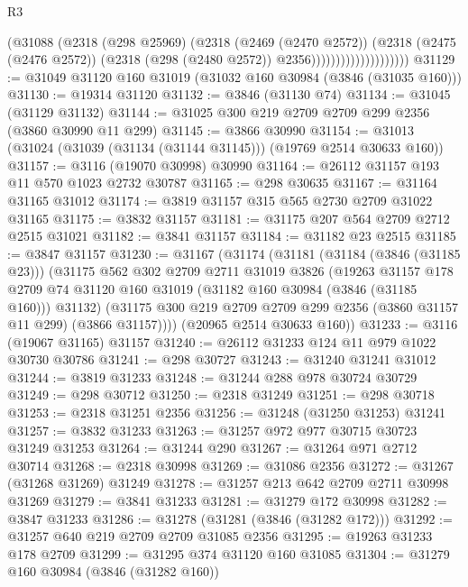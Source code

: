 \begin{lexlean}{R3}
\begin{coremodule}
                                  (@31088
                                    (@2318
                                      (@298 @25969)
                                      (@2318
                                        (@2469 (@2470 @2572))
                                        (@2318
                                          (@2475 (@2476 @2572))
                                          (@2318 (@298 (@2480 @2572)) @2356))))))))))))))))))))
@31129 := @31049 @31120 @160 @31019 (@31032 @160 @30984 (@3846 (@31035 @160)))
@31130 := @19314 @31120
@31132 := @3846 (@31130 @74)
@31134 := @31045 (@31129 @31132)
@31144 := @31025 @300 @219 @2709 @2709 @299 @2356 (@3860 @30990 @11 @299)
@31145 := @3866 @30990
@31154 := @31013 (@31024 (@31039 (@31134 (@31144 @31145))) (@19769 @2514 @30633 @160))
@31157 := @3116 (@19070 @30998) @30990
@31164 := @26112 @31157 @193 @11 @570 @1023 @2732 @30787
@31165 := @298 @30635
@31167 := @31164 @31165 @31012
@31174 := @3819 @31157 @315 @565 @2730 @2709 @31022 @31165
@31175 := @3832 @31157
@31181 := @31175 @207 @564 @2709 @2712 @2515 @31021
@31182 := @3841 @31157
@31184 := @31182 @23 @2515
@31185 := @3847 @31157
@31230 := @31167
    (@31174
      (@31181
        (@31184 (@3846 (@31185 @23)))
        (@31175
          @562
          @302
          @2709
          @2711
          @31019
          @3826
          (@19263
            @31157
            @178
            @2709
            @74
            @31120
            @160
            @31019
            (@31182 @160 @30984 (@3846 (@31185 @160)))
            @31132)
          (@31175 @300 @219 @2709 @2709 @299 @2356 (@3860 @31157 @11 @299) (@3866 @31157))))
      (@20965 @2514 @30633 @160))
@31233 := @3116 (@19067 @31165) @31157
@31240 := @26112 @31233 @124 @11 @979 @1022 @30730 @30786
@31241 := @298 @30727
@31243 := @31240 @31241 @31012
@31244 := @3819 @31233
@31248 := @31244 @288 @978 @30724 @30729
@31249 := @298 @30712
@31250 := @2318 @31249
@31251 := @298 @30718
@31253 := @2318 @31251 @2356
@31256 := @31248 (@31250 @31253) @31241
@31257 := @3832 @31233
@31263 := @31257 @972 @977 @30715 @30723 @31249 @31253
@31264 := @31244 @290
@31267 := @31264 @971 @2712 @30714
@31268 := @2318 @30998
@31269 := @31086 @2356
@31272 := @31267 (@31268 @31269) @31249
@31278 := @31257 @213 @642 @2709 @2711 @30998 @31269
@31279 := @3841 @31233
@31281 := @31279 @172 @30998
@31282 := @3847 @31233
@31286 := @31278 (@31281 (@3846 (@31282 @172)))
@31292 := @31257 @640 @219 @2709 @2709 @31085 @2356
@31295 := @19263 @31233 @178 @2709
@31299 := @31295 @374 @31120 @160 @31085
@31304 := @31279 @160 @30984 (@3846 (@31282 @160))

\end{coremodule}
\end{lexlean}

